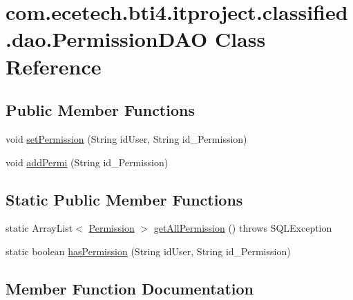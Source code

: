 \hypertarget{classcom_1_1ecetech_1_1bti4_1_1itproject_1_1classified_1_1dao_1_1_permission_d_a_o}{}\section{com.\+ecetech.\+bti4.\+itproject.\+classified.\+dao.\+Permission\+D\+AO Class Reference}
\label{classcom_1_1ecetech_1_1bti4_1_1itproject_1_1classified_1_1dao_1_1_permission_d_a_o}
\subsection*{Public Member Functions}
\begin{DoxyCompactItemize}
\item 
void \hyperlink{classcom_1_1ecetech_1_1bti4_1_1itproject_1_1classified_1_1dao_1_1_permission_d_a_o_a28a8d3624982b88f1dbf5849a82ac68a}{set\+Permission} (String id\+User, String id\+\_\+\+Permission)
\item 
void \hyperlink{classcom_1_1ecetech_1_1bti4_1_1itproject_1_1classified_1_1dao_1_1_permission_d_a_o_a144b1554142b1056f87331a20784ee15}{add\+Permi} (String id\+\_\+\+Permission)
\end{DoxyCompactItemize}
\subsection*{Static Public Member Functions}
\begin{DoxyCompactItemize}
\item 
static Array\+List$<$ \hyperlink{classcom_1_1ecetech_1_1bti4_1_1itproject_1_1classified_1_1beans_1_1_permission}{Permission} $>$ \hyperlink{classcom_1_1ecetech_1_1bti4_1_1itproject_1_1classified_1_1dao_1_1_permission_d_a_o_a35a54106c07cc5bb23e1b2c250f60b08}{get\+All\+Permission} ()  throws S\+Q\+L\+Exception 
\item 
static boolean \hyperlink{classcom_1_1ecetech_1_1bti4_1_1itproject_1_1classified_1_1dao_1_1_permission_d_a_o_a8f378b17fd7afa2048c46cf6566a3dd9}{has\+Permission} (String id\+User, String id\+\_\+\+Permission)
\end{DoxyCompactItemize}


\subsection{Member Function Documentation}
